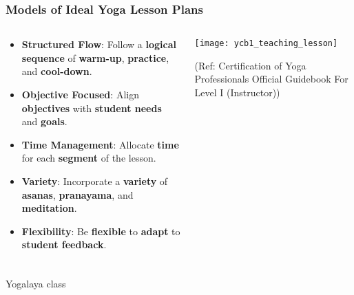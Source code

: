\begin{frame}[fragile]\frametitle{Models of Ideal Yoga Lesson Plans}
\begin{columns}
    \begin{column}[T]{0.5\linewidth}
      \begin{itemize}
        \item \textbf{Structured Flow}: Follow a \textbf{logical sequence} of \textbf{warm-up}, \textbf{practice}, and \textbf{cool-down}.
        \item \textbf{Objective Focused}: Align \textbf{objectives} with \textbf{student needs} and \textbf{goals}.
        \item \textbf{Time Management}: Allocate \textbf{time} for each \textbf{segment} of the lesson.
        \item \textbf{Variety}: Incorporate a \textbf{variety} of \textbf{asanas}, \textbf{pranayama}, and \textbf{meditation}.
        \item \textbf{Flexibility}: Be \textbf{flexible} to \textbf{adapt} to \textbf{student feedback}.
      \end{itemize}
    \end{column}
    \begin{column}[T]{0.5\linewidth}
        \begin{center}
        \texttt{[image: ycb1\_teaching\_lesson]}
		
		{\tiny (Ref: Certification  of Yoga Professionals Official Guidebook For Level I (Instructor))}	
        \end{center}	
    \end{column}
\end{columns}
\end{frame}


\begin{frame}[fragile]\frametitle{}
\begin{center}
{\Large Yogalaya class}
\end{center}
\end{frame}

